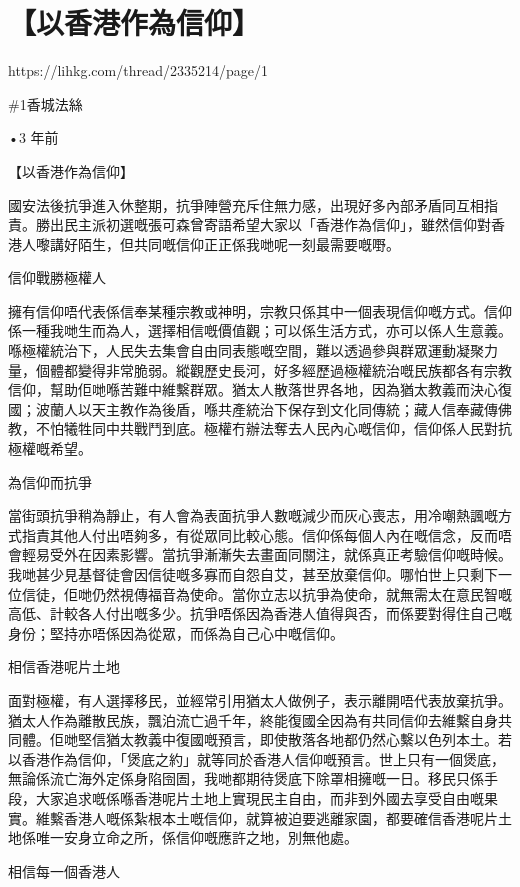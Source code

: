 \chapter{【以香港作為信仰】}

https://lihkg.com/thread/2335214/page/1

\#1香城法絲

•3 年前

【以香港作為信仰】

國安法後抗爭進入休整期，抗爭陣營充斥住無力感，出現好多內部矛盾同互相指責。勝出民主派初選嘅張可森曾寄語希望大家以「香港作為信仰」，雖然信仰對香港人嚟講好陌生，但共同嘅信仰正正係我哋呢一刻最需要嘅嘢。

信仰戰勝極權人

擁有信仰唔代表係信奉某種宗教或神明，宗教只係其中一個表現信仰嘅方式。信仰係一種我哋生而為人，選擇相信嘅價值觀；可以係生活方式，亦可以係人生意義。喺極權統治下，人民失去集會自由同表態嘅空間，難以透過參與群眾運動凝聚力量，個體都變得非常脆弱。縱觀歷史長河，好多經歷過極權統治嘅民族都各有宗教信仰，幫助佢哋喺苦難中維繫群眾。猶太人散落世界各地，因為猶太教義而決心復國；波蘭人以天主教作為後盾，喺共產統治下保存到文化同傳統；藏人信奉藏傳佛教，不怕犧牲同中共戰鬥到底。極權冇辦法奪去人民內心嘅信仰，信仰係人民對抗極權嘅希望。

為信仰而抗爭

當街頭抗爭稍為靜止，有人會為表面抗爭人數嘅減少而灰心喪志，用冷嘲熱諷嘅方式指責其他人付出唔夠多，有從眾同比較心態。信仰係每個人內在嘅信念，反而唔會輕易受外在因素影響。當抗爭漸漸失去畫面同關注，就係真正考驗信仰嘅時候。我哋甚少見基督徒會因信徒嘅多寡而自怨自艾，甚至放棄信仰。哪怕世上只剩下一位信徒，佢哋仍然視傳福音為使命。當你立志以抗爭為使命，就無需太在意民智嘅高低、計較各人付出嘅多少。抗爭唔係因為香港人值得與否，而係要對得住自己嘅身份；堅持亦唔係因為從眾，而係為自己心中嘅信仰。

相信香港呢片土地

面對極權，有人選擇移民，並經常引用猶太人做例子，表示離開唔代表放棄抗爭。猶太人作為離散民族，飄泊流亡過千年，終能復國全因為有共同信仰去維繫自身共同體。佢哋堅信猶太教義中復國嘅預言，即使散落各地都仍然心繫以色列本土。若以香港作為信仰，「煲底之約」就等同於香港人信仰嘅預言。世上只有一個煲底，無論係流亡海外定係身陷囹圄，我哋都期待煲底下除罩相擁嘅一日。移民只係手段，大家追求嘅係喺香港呢片土地上實現民主自由，而非到外國去享受自由嘅果實。維繫香港人嘅係紮根本土嘅信仰，就算被迫要逃離家園，都要確信香港呢片土地係唯一安身立命之所，係信仰嘅應許之地，別無他處。

相信每一個香港人

